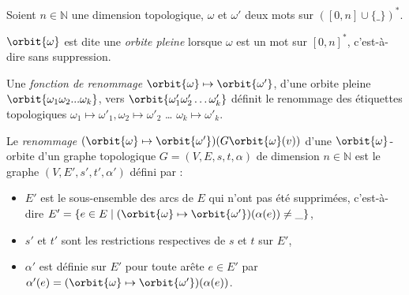 \begin{definition}[Renommage]\label{def:renommage-orbite}%
	Soient $n \in \mathbb{N}$ une dimension topologique, $\omega$ et $\omega'$ deux mots sur $([0,n] \cup \{ \_ \})^*$.

	$\orbit{\omega}$ est dite une \emph{orbite pleine} lorsque $\omega$ est un mot sur $[0,n]^*$, c'est-à-dire sans suppression.

	Une \emph{fonction de renommage} $\orbit{\omega} \mapsto \orbit{\omega'}$, d'une orbite pleine
	$\orbit{\omega_1 \omega_2 ... \omega_k}$, vers $\orbit{\omega'_1 \omega'_2 \dots \omega'_k}$ définit
	le renommage des étiquettes topologiques $\omega_1 \mapsto \omega'_1, \omega_2 \mapsto \omega'_2$ \ldots
	$\omega_k \mapsto \omega'_k$. %

	Le \emph{renommage} $(\orbit{\omega} \mapsto \orbit{\omega'})(G\orbit{\omega}(v))$ d'une
	$\orbit{\omega}$-orbite d'un graphe topologique $G=(V,E,s,t,\alpha)$ de dimension $n \in \mathbb{N}$ est le graphe
	$(V,E',s',t',\alpha')$ défini par :
	\begin{itemize}
		\item $E'$ est le sous-ensemble des arcs de $E$ qui n'ont pas été
		      supprimées, c'est-à-dire
		      $E'=\{e \in E \mid (\orbit{\omega} \mapsto \orbit{\omega'})(\alpha(e)) \neq \_ \}$,

		\item $s'$ et $t'$ sont les restrictions respectives de $s$ et $t$ sur
		      $E'$,

		\item $\alpha'$ est définie sur $E'$ pour toute arête $e \in E'$ par
		      $\alpha'(e) = (\orbit{\omega} \mapsto \orbit{\omega'})(\alpha(e))$.
	\end{itemize}
\end{definition}


